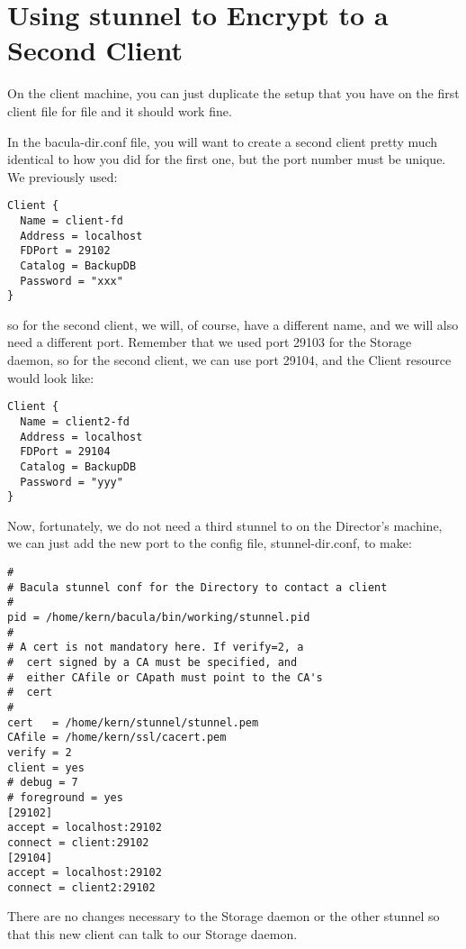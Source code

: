 \section{Using stunnel to Encrypt to a Second Client}

On the client machine, you can just duplicate the setup that you have on the
first client file for file and it should work fine. 

In the bacula-dir.conf file, you will want to create a second client pretty
much identical to how you did for the first one, but the port number must be
unique. We previously used: 

\footnotesize
\begin{verbatim}
Client {
  Name = client-fd
  Address = localhost
  FDPort = 29102
  Catalog = BackupDB
  Password = "xxx"
}
\end{verbatim}
\normalsize

so for the second client, we will, of course, have a different name, and we
will also need a different port. Remember that we used port 29103 for the
Storage daemon, so for the second client, we can use port 29104, and the
Client resource would look like: 

\footnotesize
\begin{verbatim}
Client {
  Name = client2-fd
  Address = localhost
  FDPort = 29104
  Catalog = BackupDB
  Password = "yyy"
}
\end{verbatim}
\normalsize

Now, fortunately, we do not need a third stunnel to on the Director's machine,
we can just add the new port to the config file, stunnel-dir.conf, to make: 

\footnotesize
\begin{verbatim}
#
# Bacula stunnel conf for the Directory to contact a client
#
pid = /home/kern/bacula/bin/working/stunnel.pid
#
# A cert is not mandatory here. If verify=2, a
#  cert signed by a CA must be specified, and
#  either CAfile or CApath must point to the CA's
#  cert
#
cert   = /home/kern/stunnel/stunnel.pem
CAfile = /home/kern/ssl/cacert.pem
verify = 2
client = yes
# debug = 7
# foreground = yes
[29102]
accept = localhost:29102
connect = client:29102
[29104]
accept = localhost:29102
connect = client2:29102
\end{verbatim}
\normalsize

There are no changes necessary to the Storage daemon or the other stunnel so
that this new client can talk to our Storage daemon. 

